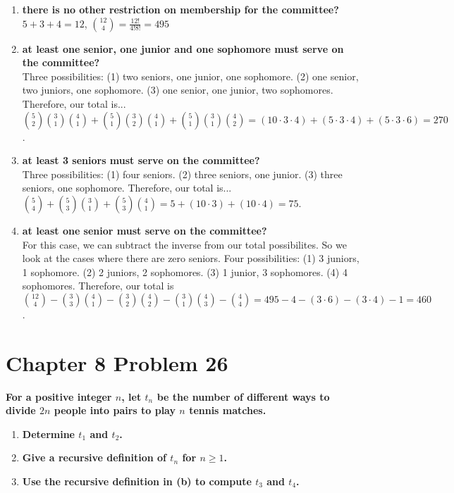 \documentclass[10pt]{article}
\begin{document}
\begin{enumerate}[label=(\alph*)]
    \item \textbf{there is no other restriction on membership for the committee?} \\
        $5 + 3 + 4 = 12$, $\binom{12}{4} = \frac{12!}{4!8!} = 495$

    \item \textbf{at least one senior, one junior and one sophomore must serve on the committee?} \\
        Three possibilities: (1) two seniors, one junior, one sophomore.  (2) one senior, two juniors, one sophomore.  (3) one senior, one junior,
        two sophomores.  Therefore, our total is... \\
        $\binom52\binom31\binom41 + \binom51\binom32\binom41 + \binom51\binom31\binom42 = (10\cdot3\cdot4) + (5\cdot3\cdot4) + (5\cdot3\cdot6) = 270$.

    \item \textbf{at least 3 seniors must serve on the committee?} \\
        Three possibilities: (1) four seniors.  (2) three seniors, one junior.  (3) three seniors, one sophomore.  Therefore, our total is... \\
        $\binom54 + \binom53\binom31 + \binom53\binom41 = 5 + (10\cdot3) + (10\cdot4) = 75$.

    \item \textbf{at least one senior must serve on the committee?} \\
        For this case, we can subtract the inverse from our total possibilites.  So we look at the cases where there are zero seniors.  Four
        possibilities: (1) 3 juniors, 1 sophomore.  (2) 2 juniors, 2 sophomores.  (3) 1 junior, 3 sophomores.  (4) 4 sophomores.  Therefore, our total
        is \\
        $\binom{12}{4} - \binom33\binom41 - \binom32\binom42 - \binom31\binom43 - \binom44 = 495 - 4 - (3\cdot6) - (3\cdot4) - 1 = 460$.

\end{enumerate}


\section{Chapter 8 Problem 26}
\textbf{For a positive integer $n$, let $t_n$ be the number of different ways to divide $2n$ people into pairs to play $n$
tennis matches.}

\begin{enumerate}[label=(\alph*)]
    \item \textbf{Determine $t_1$ and $t_2$.} \\

    \item \textbf{Give a recursive definition of $t_n$ for $n \geq 1$.} \\

    \item \textbf{Use the recursive definition in (b) to compute $t_3$ and $t_4$.} \\

\end{enumerate}
\end{document}

